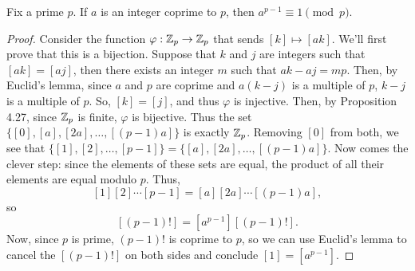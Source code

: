\documentclass[../main.tex]{subfiles}
\begin{document}
\begin{theorem}
Fix a prime $p$. If $a$ is an integer coprime to $p$, then $a^{p-1} \equiv 1 \pmod{p}$.
\end{theorem}

\begin{proof}
Consider the function $\varphi:\mathbb Z_p \to \mathbb Z_p$ that sends $[k] \mapsto [ak]$. We'll first prove that this is a bijection. Suppose that $k$ and $j$ are integers such that $[ak]=[aj]$, then there exists an integer $m$ such that $ak-aj =mp$. Then, by Euclid's lemma, since $a$ and $p$ are coprime and $a(k-j)$ is a multiple of $p$, $k-j$ is a multiple of $p$. So, $[k]=[j]$, and thus $\varphi$ is injective. Then, by Proposition 4.27, since $\mathbb Z_p$ is finite, $\varphi$ is bijective. Thus the set $\{[0], [a],[2a],\dots,[(p-1)a]\}$ is exactly $\mathbb Z_p$. Removing $[0]$ from both, we see that $\{[1],[2],\dots,[p-1]\}=\{[a],[2a],\dots,[(p-1)a]\}$. Now comes the clever step: since the elements of these sets are equal, the product of all their elements are equal modulo $p$. Thus, $$[1][2]\cdots[p-1]=[a][2a]\cdots[(p-1)a],$$ so  $$[(p-1)!]=[a^{p-1}][(p-1)!].$$ Now, since $p$ is prime, $(p-1)!$ is coprime to $p$, so we can use Euclid's lemma to cancel the $[(p-1)!]$ on both sides and conclude $[1]=[a^{p-1}]$.
\end{proof}
\end{document}
